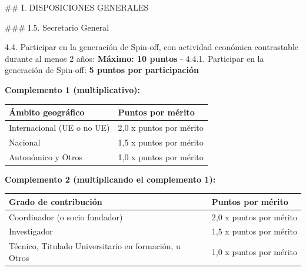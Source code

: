 \documentclass{article}
\begin{document}
\begin{itemize}
\begin{itemize}
\begin{scriptsize}
                  \#\# I. DISPOSICIONES GENERALES

                  \#\#\# I.5. Secretario General

                  4.4. Participar en la generación de Spin-off, con actividad económica contrastable durante al menos 2 años:
                  \textbf{Máximo: 10 puntos}
                  - 4.4.1. Participar en la generación de Spin-off: \textbf{5 puntos por participación}

                  \textbf{Complemento 1 (multiplicativo):}
                  \vspace{0.4cm}
                  \begin{table}[h!]\centering\renewcommand{\arraystretch}{1.3}
                    \begin{tabular}{|p{}|p{}|}\hline
                      Ámbito geográfico          & Puntos por mérito       \\\hline
                      Internacional (UE o no UE) & 2,0 x puntos por mérito \\\hline
                      Nacional                   & 1,5 x puntos por mérito \\\hline
                      Autonómico y Otros         & 1,0 x puntos por mérito \\\hline
                    \end{tabular}\end{table}
                  \vspace{0.4cm}

                  \textbf{Complemento 2 (multiplicando el complemento 1):}
                  \vspace{0.4cm}
                  \begin{table}[h!]\centering\renewcommand{\arraystretch}{1.3}
                    \begin{tabular}{|p{}|p{}|}\hline
                      Grado de contribución                                 & Puntos por mérito       \\\hline
                      Coordinador (o socio fundador)                        & 2,0 x puntos por mérito \\\hline
                      Investigador                                          & 1,5 x puntos por mérito \\\hline
                      Técnico, Titulado Universitario en formación, u Otros & 1,0 x puntos por mérito \\\hline
                    \end{tabular}\end{table}
                  \vspace{0.4cm}


\end{scriptsize}
\end{itemize}
\end{itemize}
\end{document}
